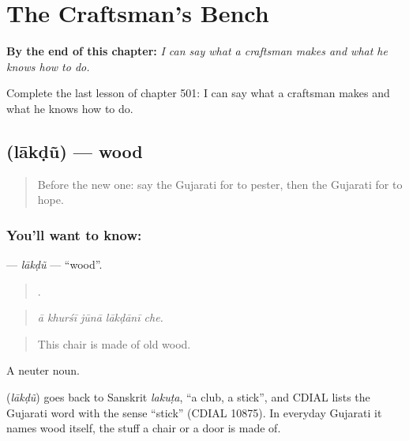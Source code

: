 
\chapter{The Craftsman's Bench}
\label{ch:gu-the-craftsman-s-bench}

\begin{chapteropening}
\textbf{By the end of this chapter:} \emph{I can say what a craftsman makes and what he knows how to do.}

Complete the last lesson of chapter 501: I can say what a craftsman makes and what he knows how to do.
\end{chapteropening}

\section[\texorpdfstring{\gu{લાકડું} (lākḍũ)}{લાકડું (lākḍũ)}]{ (lākḍũ) — wood}

\label{lesson:GU-C501-lakdu}



\begin{quote}
Before the new one: say the Gujarati for to pester, then the Gujarati for to hope.
\end{quote}

\subsection*{You'll want to know: }
\textbf{} — \emph{lākḍũ} — \textquotedblleft{}wood\textquotedblright{}.

\begin{quote}
    .
\end{quote}

\begin{quote}
\emph{ā khurśī jūnā lākḍānī che.}
\end{quote}

\begin{quote}
This chair is made of old wood.
\end{quote}

A neuter noun.

\begin{cousinweb}
\textbf{} (\emph{lākḍũ}) goes back to Sanskrit \emph{lakuṭa}, \textquotedblleft{}a club, a stick\textquotedblright{}, and CDIAL lists the Gujarati word with the sense \textquotedblleft{}stick\textquotedblright{} (CDIAL 10875). In everyday Gujarati it names wood itself, the stuff a chair or a door is made of.
\end{cousinweb}

